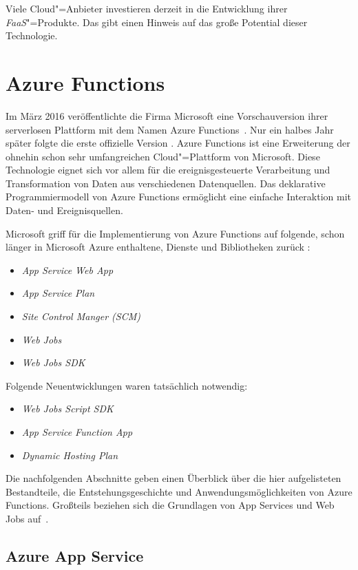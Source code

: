 Viele Cloud"=Anbieter investieren derzeit in die Entwicklung ihrer \textit{FaaS}"=Produkte. Das gibt einen Hinweis auf das große Potential dieser Technologie.

\section{Azure Functions}

Im März 2016 veröffentlichte die Firma Microsoft eine Vorschauversion ihrer serverlosen Plattform mit dem Namen Azure Functions~\cite{AzFunIntro}. Nur ein halbes Jahr später folgte die erste offizielle Version \cite{AzFunGA}. Azure  Functions ist eine Erweiterung der ohnehin schon sehr umfangreichen Cloud"=Plattform von Microsoft. Diese Technologie eignet sich vor allem für die ereignisgesteuerte Verarbeitung und Transformation von Daten aus verschiedenen Datenquellen. Das deklarative Programmiermodell von Azure Functions ermöglicht eine einfache Interaktion mit Daten- und Ereignisquellen. 

Microsoft griff für die Implementierung von Azure Functions auf folgende, schon länger in Microsoft Azure enthaltene, Dienste und Bibliotheken zurück \cite{AzFunJourney}:

\begin{itemize}
	\item \textit{App Service Web App}
	\item \textit{App Service Plan}
	\item \textit{Site Control Manger (SCM)}
	\item \textit{Web Jobs}
	\item \textit{Web Jobs SDK}
\end{itemize}
Folgende Neuentwicklungen waren tatsächlich notwendig:
\begin{itemize}
	\item \textit{Web Jobs Script SDK}
	\item \textit{App Service Function App}
	\item \textit{Dynamic Hosting Plan}
\end{itemize}

Die nachfolgenden Abschnitte geben einen Überblick über die hier aufgelisteten Bestandteile, die Entstehungsgeschichte und Anwendungsmöglichkeiten von Azure Functions. Großteils beziehen sich die Grundlagen von App Services und Web Jobs auf~\cite{AzWebEssentials4Devs}.

\subsection{Azure App Service}

